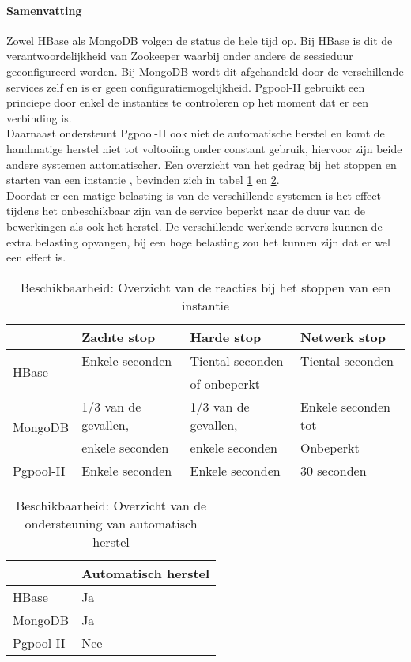 \paragraph{Samenvatting} Zowel HBase als MongoDB volgen de status de hele tijd op. Bij HBase is dit de verantwoordelijkheid van Zookeeper waarbij onder andere de sessieduur geconfigureerd worden. Bij MongoDB wordt dit afgehandeld door de verschillende services zelf en is er geen configuratiemogelijkheid. Pgpool-II gebruikt een princiepe door enkel de instanties te controleren op het moment dat er een verbinding is. \\
Daarnaast ondersteunt Pgpool-II ook niet de automatische herstel en komt de handmatige herstel niet tot voltooiing onder constant gebruik, hiervoor zijn beide andere systemen automatischer. Een overzicht van het gedrag bij het stoppen en starten van een instantie , bevinden zich in tabel \ref{table:beschikbaarheid-stop-resultaat} en \ref{table:beschikbaarheid-herstel-resultaat}. \\
Doordat er een matige belasting is van de verschillende systemen is het effect tijdens het onbeschikbaar zijn van de service beperkt naar de duur van de bewerkingen als ook het herstel. De verschillende werkende servers kunnen de extra belasting opvangen, bij een hoge belasting zou het kunnen zijn dat er wel een effect is. 

\begin{table}[htbp]
  \centering
    \begin{tabular}{l | lll}
          & Zachte stop & Harde stop & Netwerk stop \\
    \hline
    \multirow{2}{*}{HBase} & Enkele seconden & Tiental seconden & Tiental seconden \\
    & & of onbeperkt&  \\
    \multirow{2}{*}{MongoDB} & 1/3 van de gevallen, & 1/3 van de gevallen, & Enkele seconden tot \\
    & enkele seconden & enkele seconden & Onbeperkt\\
    Pgpool-II & Enkele seconden & Enkele seconden & 30 seconden \\
    \end{tabular}%
    \caption{Beschikbaarheid: Overzicht van de reacties bij het stoppen van een instantie }
  \label{table:beschikbaarheid-stop-resultaat}%
\end{table}

\begin{table}[htbp]
  \centering
    \begin{tabular}{l|l}
          & Automatisch herstel \\
    \hline
    HBase & Ja \\
    MongoDB & Ja \\
    Pgpool-II & Nee \\
    \end{tabular}%
      \caption{Beschikbaarheid: Overzicht van de ondersteuning van automatisch herstel}
  \label{table:beschikbaarheid-herstel-resultaat}%
\end{table}%


